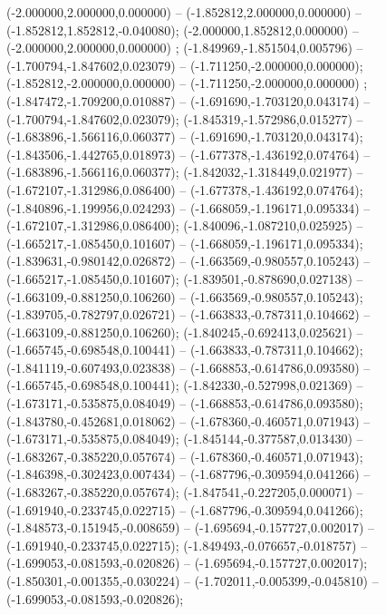  (-2.000000,2.000000,0.000000) -- (-1.852812,2.000000,0.000000) -- (-1.852812,1.852812,-0.040080);
 (-2.000000,1.852812,0.000000) -- (-2.000000,2.000000,0.000000) ;
 (-1.849969,-1.851504,0.005796) -- (-1.700794,-1.847602,0.023079) -- (-1.711250,-2.000000,0.000000);
 (-1.852812,-2.000000,0.000000) -- (-1.711250,-2.000000,0.000000) ;
 (-1.847472,-1.709200,0.010887) -- (-1.691690,-1.703120,0.043174) -- (-1.700794,-1.847602,0.023079);
 (-1.845319,-1.572986,0.015277) -- (-1.683896,-1.566116,0.060377) -- (-1.691690,-1.703120,0.043174);
 (-1.843506,-1.442765,0.018973) -- (-1.677378,-1.436192,0.074764) -- (-1.683896,-1.566116,0.060377);
 (-1.842032,-1.318449,0.021977) -- (-1.672107,-1.312986,0.086400) -- (-1.677378,-1.436192,0.074764);
 (-1.840896,-1.199956,0.024293) -- (-1.668059,-1.196171,0.095334) -- (-1.672107,-1.312986,0.086400);
 (-1.840096,-1.087210,0.025925) -- (-1.665217,-1.085450,0.101607) -- (-1.668059,-1.196171,0.095334);
 (-1.839631,-0.980142,0.026872) -- (-1.663569,-0.980557,0.105243) -- (-1.665217,-1.085450,0.101607);
 (-1.839501,-0.878690,0.027138) -- (-1.663109,-0.881250,0.106260) -- (-1.663569,-0.980557,0.105243);
 (-1.839705,-0.782797,0.026721) -- (-1.663833,-0.787311,0.104662) -- (-1.663109,-0.881250,0.106260);
 (-1.840245,-0.692413,0.025621) -- (-1.665745,-0.698548,0.100441) -- (-1.663833,-0.787311,0.104662);
 (-1.841119,-0.607493,0.023838) -- (-1.668853,-0.614786,0.093580) -- (-1.665745,-0.698548,0.100441);
 (-1.842330,-0.527998,0.021369) -- (-1.673171,-0.535875,0.084049) -- (-1.668853,-0.614786,0.093580);
 (-1.843780,-0.452681,0.018062) -- (-1.678360,-0.460571,0.071943) -- (-1.673171,-0.535875,0.084049);
 (-1.845144,-0.377587,0.013430) -- (-1.683267,-0.385220,0.057674) -- (-1.678360,-0.460571,0.071943);
 (-1.846398,-0.302423,0.007434) -- (-1.687796,-0.309594,0.041266) -- (-1.683267,-0.385220,0.057674);
 (-1.847541,-0.227205,0.000071) -- (-1.691940,-0.233745,0.022715) -- (-1.687796,-0.309594,0.041266);
 (-1.848573,-0.151945,-0.008659) -- (-1.695694,-0.157727,0.002017) -- (-1.691940,-0.233745,0.022715);
 (-1.849493,-0.076657,-0.018757) -- (-1.699053,-0.081593,-0.020826) -- (-1.695694,-0.157727,0.002017);
 (-1.850301,-0.001355,-0.030224) -- (-1.702011,-0.005399,-0.045810) -- (-1.699053,-0.081593,-0.020826);
